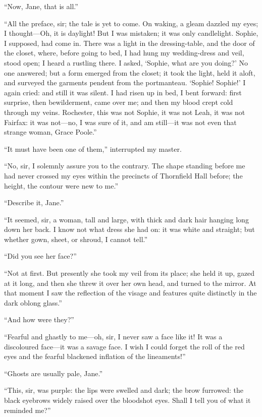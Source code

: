 \enquote{Now, Jane, that is all.}

\enquote{All the preface, sir; the tale is yet to come.  On waking, a
gleam dazzled my eyes; I thought---Oh, it is daylight!  But I was
mistaken; it was only candlelight.  Sophie, I supposed, had come in. 
There was a light in the dressing-table, and the door of the closet,
where, before going to bed, I had hung my wedding-dress and veil, stood
open; I heard a rustling there.  I asked, \enquote{Sophie, what are you
doing?}  No one answered; but a form emerged from the closet; it took
the light, held it aloft, and surveyed the garments pendent from the
portmanteau.  \enquote{Sophie!  Sophie!}  I again cried: and still it
was silent.  I had risen up in bed, I bent forward: first surprise, then
bewilderment, came over me; and then my blood crept cold through my
veins.  \Mr{} Rochester, this was not Sophie, it was not Leah, it was not
\Mrs{} Fairfax: it was not---no, I was sure of it, and am still---it was
not even that strange woman, Grace Poole.}

\enquote{It must have been one of them,} interrupted my master.

\enquote{No, sir, I solemnly assure you to the contrary.  The shape
standing before me had never crossed my eyes within the precincts of
Thornfield Hall before; the height, the contour were new to me.}

\enquote{Describe it, Jane.}

\enquote{It seemed, sir, a woman, tall and large, with thick and dark
hair hanging long down her back.  I know not what dress she had on: it
was white and straight; but whether gown, sheet, or shroud, I cannot
tell.}

\enquote{Did you see her face?}

\enquote{Not at first.  But presently she took my veil from its place;
she held it up, gazed at it long, and then she threw it over her own
head, and turned to the mirror.  At that moment I saw the reflection of
the visage and features quite distinctly in the dark oblong glass.}

\enquote{And how were they?}

\enquote{Fearful and ghastly to me---oh, sir, I never saw a face like
it!  It was a discoloured face---it was a savage face.  I wish I could
forget the roll of the red eyes and the fearful blackened inflation of
the lineaments!}

\enquote{Ghosts are usually pale, Jane.}

\enquote{This, sir, was purple: the lips were swelled and dark; the brow
furrowed: the black eyebrows widely raised over the bloodshot eyes. 
Shall I tell you of what it reminded me?}

